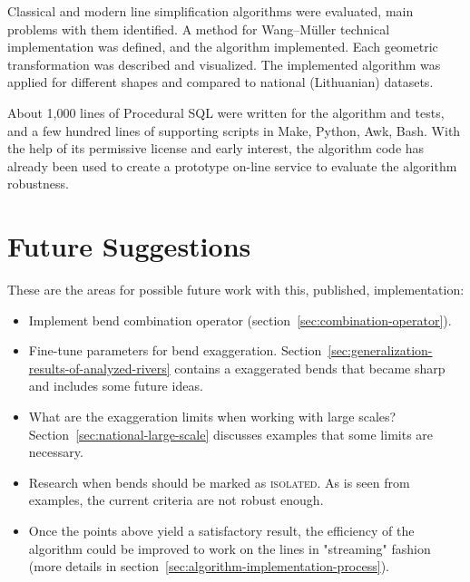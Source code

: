 \documentclass[a4paper]{article}
\newcommand{\WM}{Wang--M{\"u}ller}
\begin{document}
Classical and modern line simplification algorithms were evaluated,
main problems with them identified. A method for {\WM} technical
implementation was defined, and the algorithm implemented. Each geometric
transformation was described and visualized. The implemented algorithm was
applied for different shapes and compared to national (Lithuanian) datasets.

About 1,000 lines of Procedural SQL were written for the algorithm and tests,
and a few hundred lines of supporting scripts in Make, Python, Awk, Bash. With
the help of its permissive license and early interest, the algorithm code has
already been used to create a prototype on-line service to evaluate the
algorithm robustness.

\section{Future Suggestions}
\label{sec:future-suggestions}

These are the areas for possible future work with this, published,
implementation:

\begin{itemize}

    \item Implement bend combination operator
        (section~\ref{sec:combination-operator}).

    \item Fine-tune parameters for bend exaggeration.
        Section~\ref{sec:generalization-results-of-analyzed-rivers} contains
        a exaggerated bends that became sharp and includes some future ideas.

    \item What are the exaggeration limits when working with large scales?
        Section~\ref{sec:national-large-scale} discusses examples that some
        limits are necessary.

    \item Research when bends should be marked as \textsc{isolated}. As is
        seen from examples, the current criteria are not robust enough.

    \item Once the points above yield a satisfactory result, the efficiency of the
        algorithm could be improved to work on the lines in "streaming" fashion
        (more details in section~\ref{sec:algorithm-implementation-process}).

\end{itemize}
\end{document}
